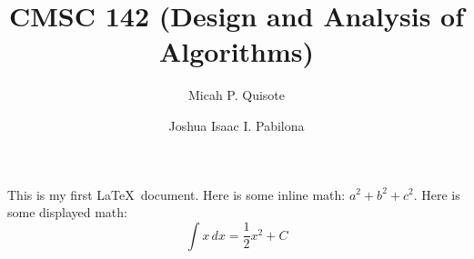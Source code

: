 \documentclass{article}
\begin{document}
  
\title{CMSC 142 (Design and Analysis of Algorithms)}  
\author{Micah P. Quisote}  
\author{Joshua Isaac I. Pabilona}
\maketitle  This is my first  \LaTeX\ document.  Here is some inline math: $a^2 + b^2 + c^2$.  
Here is some displayed math:  
\[ \int x \, dx = \frac{1}{2} x^2 + C \]  
\end{document}
